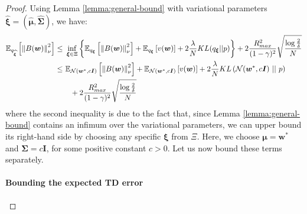 \documentclass{article}
\newcommand{\wh}[1]{\widehat{#1}}
\newcommand{\norm}[1]{\left\lVert #1 \right\rVert}
\begin{document}
\begin{proof}
Using Lemma \ref{lemma:general-bound} with variational parameters $\wh{\bm{\xi}} = (\wh{\bm{\mu}},\wh{\bm{\Sigma}})$, we have:
\begin{align}\label{eq:thg-4}
\mathbb{E}_{q_{\wh{\bm{\xi}}}}\left[ \norm{B(\bm{w})}_{\nu}^2 \right ] \leq\ & \inf_{\bm{\xi} \in \Xi}\left\{ \mathbb{E}_{q_{\bm{\xi}}}\left[ \norm{B(\bm{w})}_{\nu}^2 \right ] + \mathbb{E}_{q_{\bm{\xi}}}\left[ v(\bm{w}) \right] + 2\frac{\lambda}{N} KL({q_{\bm{\xi}}}||p) \right\} + 2\frac{R_{max}^2}{(1-\gamma)^2}\sqrt{\frac{\log\frac{2}{\delta}}{N}}\notag\\ \leq\ & \mathbb{E}_{\mathcal{N}(\bm{w}^*,c\bm{I})}\left[ \norm{B(\bm{w})}_{\nu}^2 \right ] + \mathbb{E}_{\mathcal{N}(\bm{w}^*,c\bm{I})}\left[ v(\bm{w}) \right] + 2\frac{\lambda}{N} KL\left(\mathcal{N}(\bm{w}^*,c\bm{I})\ ||\ p\right)\notag\\ &\ \ + 2\frac{R_{max}^2}{(1-\gamma)^2}\sqrt{\frac{\log\frac{2}{\delta}}{N}}
\end{align}
where the second inequality is due to the fact that, since Lemma \ref{lemma:general-bound} contains an infimum over the variational parameters, we can upper bound its right-hand side by choosing any specific $\bm{\xi}$ from $\Xi$. Here, we choose $\bm{\mu} = \bm{w}^*$ and $\bm{\Sigma} = c\bm{I}$, for some positive constant $c>0$. Let us now bound these terms separately.

\paragraph*{Bounding the expected TD error}


\end{proof}
\end{document}
